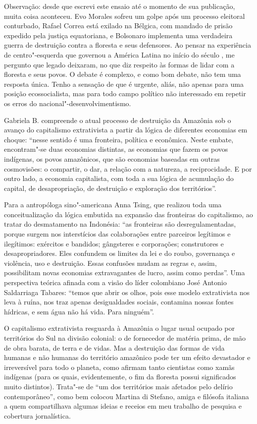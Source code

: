Observação: desde que escrevi este ensaio até o momento de sua publicação, muita coisa aconteceu. Evo Morales sofreu um golpe após um processo eleitoral conturbado, Rafael Correa está exilado na Bélgica, com mandado de prisão expedido pela justiça equatoriana, e Bolsonaro implementa uma verdadeira guerra de destruição contra a floresta e seus defensores. Ao pensar na experiência de centro"-esquerda que governou a América Latina no início do século , me pergunto que legado deixaram, no que diz respeito às formas de lidar com a floresta e seus povos. O debate é complexo, e como bom debate, não tem uma resposta única. Tenho a sensação de que é urgente, aliás, não apenas para uma posição ecossocialista, mas para todo campo político não interessado em repetir os erros do nacional"-desenvolvimentismo.

\asterisc

Gabriela B. compreende o atual processo de destruição da Amazônia sob o
avanço do capitalismo extrativista a partir da lógica de diferentes
economias em choque: ``nesse sentido é uma fronteira, política e
econômica. Neste embate, encontram"-se duas economias distintas, as
economias que fazem os povos indígenas, os povos amazônicos, que são
economias baseadas em outras cosmovisões: o compartir, o dar, a relação
com a natureza, a reciprocidade. E por outro lado, a economia
capitalista, com toda a sua lógica de acumulação do capital, de
desapropriação, de destruição e exploração dos territórios''.

Para a antropóloga sino"-americana Anna Tsing, que realizou toda uma
conceitualização da lógica embutida na expansão das fronteiras do
capitalismo, ao tratar do desmatamento na Indonésia: ``as fronteiras são desregulamentadas, porque surgem nos interstícios das colaborações entre parceiros legítimos e ilegítimos: exércitos e bandidos; gângsteres e corporações; construtores e desapropriadores. Eles confundem os limites da lei e do roubo, governança e  violência, uso e destruição. Essas confusões mudam as regras e, assim, possibilitam novas economias extravagantes de lucro, assim como perdas''. %
Uma perspectiva
teórica afinada com a visão do líder colombiano José Antonio Saldarriaga
Tabares: ``temos que abrir os olhos, pois esse modelo extrativista nos
leva à ruína, nos traz apenas desigualdades sociais, contamina nossas
fontes hídricas, e sem água não há vida. Para ninguém''.

O capitalismo extrativista resguarda à Amazônia o lugar usual ocupado
por territórios do Sul na divisão colonial: o de fornecedor de matéria
prima, de mão de obra barata, de terra e de vidas. Mas a destruição das
formas de vida humanas e não humanas do território amazônico pode ter um
efeito devastador e irreversível para todo o planeta, como afirmam tanto
cientistas como xamãs indígenas (para os quais, evidentemente, o fim
da floresta possui significados muito distintos). Trata"-se de ``um dos
territórios mais afetados pelo delírio contemporâneo'', como bem colocou
Martina di Stefano, amiga e filósofa italiana a quem compartilhava algumas ideias e
receios em meu trabalho de pesquisa e cobertura jornalística.

